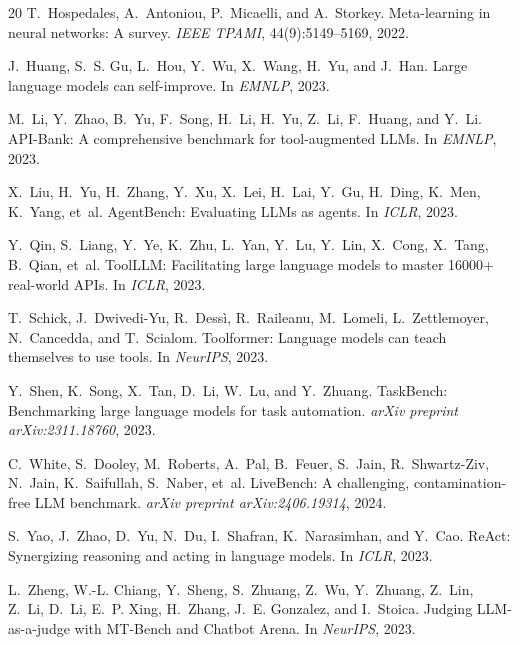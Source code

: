 \documentclass[11pt,a4paper]{article}
\begin{document}
\begin{thebibliography}{20}
T.~Hospedales, A.~Antoniou, P.~Micaelli, and A.~Storkey.
\newblock Meta-learning in neural networks: A survey.
\newblock \emph{IEEE TPAMI}, 44(9):5149--5169, 2022.

J.~Huang, S.~S. Gu, L.~Hou, Y.~Wu, X.~Wang, H.~Yu, and J.~Han.
\newblock Large language models can self-improve.
\newblock In \emph{EMNLP}, 2023.

M.~Li, Y.~Zhao, B.~Yu, F.~Song, H.~Li, H.~Yu, Z.~Li, F.~Huang, and Y.~Li.
\newblock API-Bank: A comprehensive benchmark for tool-augmented LLMs.
\newblock In \emph{EMNLP}, 2023.

X.~Liu, H.~Yu, H.~Zhang, Y.~Xu, X.~Lei, H.~Lai, Y.~Gu, H.~Ding, K.~Men, K.~Yang, et~al.
\newblock AgentBench: Evaluating LLMs as agents.
\newblock In \emph{ICLR}, 2023.

Y.~Qin, S.~Liang, Y.~Ye, K.~Zhu, L.~Yan, Y.~Lu, Y.~Lin, X.~Cong, X.~Tang, B.~Qian, et~al.
\newblock ToolLLM: Facilitating large language models to master 16000+ real-world APIs.
\newblock In \emph{ICLR}, 2023.

T.~Schick, J.~Dwivedi-Yu, R.~Dess{\`i}, R.~Raileanu, M.~Lomeli, L.~Zettlemoyer, N.~Cancedda, and T.~Scialom.
\newblock Toolformer: Language models can teach themselves to use tools.
\newblock In \emph{NeurIPS}, 2023.

Y.~Shen, K.~Song, X.~Tan, D.~Li, W.~Lu, and Y.~Zhuang.
\newblock TaskBench: Benchmarking large language models for task automation.
\newblock \emph{arXiv preprint arXiv:2311.18760}, 2023.

C.~White, S.~Dooley, M.~Roberts, A.~Pal, B.~Feuer, S.~Jain, R.~Shwartz-Ziv, N.~Jain, K.~Saifullah, S.~Naber, et~al.
\newblock LiveBench: A challenging, contamination-free LLM benchmark.
\newblock \emph{arXiv preprint arXiv:2406.19314}, 2024.

S.~Yao, J.~Zhao, D.~Yu, N.~Du, I.~Shafran, K.~Narasimhan, and Y.~Cao.
\newblock ReAct: Synergizing reasoning and acting in language models.
\newblock In \emph{ICLR}, 2023.

L.~Zheng, W.-L. Chiang, Y.~Sheng, S.~Zhuang, Z.~Wu, Y.~Zhuang, Z.~Lin, Z.~Li, D.~Li, E.~P. Xing, H.~Zhang, J.~E. Gonzalez, and I.~Stoica.
\newblock Judging LLM-as-a-judge with MT-Bench and Chatbot Arena.
\newblock In \emph{NeurIPS}, 2023.

\end{thebibliography}
\end{document}
